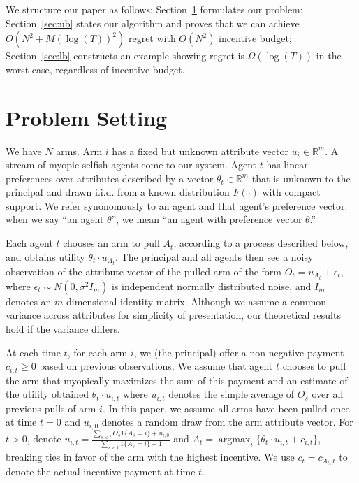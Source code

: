 \documentclass{article}
\newcommand{\argmax}{\mathop{\mathrm{argmax}}}
\begin{document}
We structure our paper as follows: Section~\ref{sec:prob} formulates our problem; Section~\ref{sec:ub} states our algorithm and proves that we can achieve $O(N^2+M(\log(T))^2)$ regret with $O(N^2)$ incentive budget; Section~\ref{sec:lb} constructs an example showing regret is $\Omega(\log(T))$ in the worst case, regardless of incentive budget.




\section{Problem Setting}
\label{sec:prob}

We have $N$ arms. Arm $i$ has a fixed but unknown attribute vector $u_i\in \mathbb{R}^{m}$. 
A stream of myopic selfish agents come to our system.  Agent $t$ has linear preferences over attributes described by a vector $\theta_t \in \mathbb{R}^m$ that is unknown to the principal and drawn i.i.d. from a known distribution $F(\cdot)$ with compact support. We refer synonomously to an agent and that agent's preference vector: when we say ``an agent $\theta$'', we mean ``an agent with preference vector $\theta$.''

Each agent $t$ chooses an arm to pull $A_t$, according to a process described below, and obtains utility $\theta_t \cdot u_{A_{t}}$.  The principal and all agents then see a noisy observation of the attribute vector of the pulled arm of the form $O_t=u_{A_{t}}+\epsilon_{t}$, where $\epsilon_t\sim N(0, \sigma^2 I_{m})$ is independent normally distributed noise, and $I_m$ denotes an $m$-dimensional identity matrix.  Although we assume a common variance across attributes for simplicity of presentation, our theoretical results hold if the variance differs.

At each time $t$, for each arm $i$, we (the principal) offer a non-negative payment $c_{i,t}\geq 0$ based on previous observations.
We assume that agent $t$ chooses to pull the arm that myopically maximizes the sum of this payment and an estimate of the utility obtained $\theta_t \cdot u_{i,t}$ where $u_{i,t}$ denotes the simple average of $O_s$ over all previous pulls of arm $i$. In this paper, we assume all arms have been pulled once at time $t=0$ and $u_{i,0}$ denotes a random draw from the arm attribute vector. For $t>0$, denote $u_{i,t} = \frac{\sum_{s<t} O_s 1\{A_s = i\} + u_{i,0}}{\sum_{s<t} 1\{A_s = i\}+1}$ and $A_t=\argmax_{i}\{\theta_t\cdot u_{i,t}+c_{i,t}\}$, breaking ties in favor of the arm with the highest incentive.  We use $c_t=c_{A_{t},t}$ to denote the actual incentive payment at time $t$.
\end{document}

